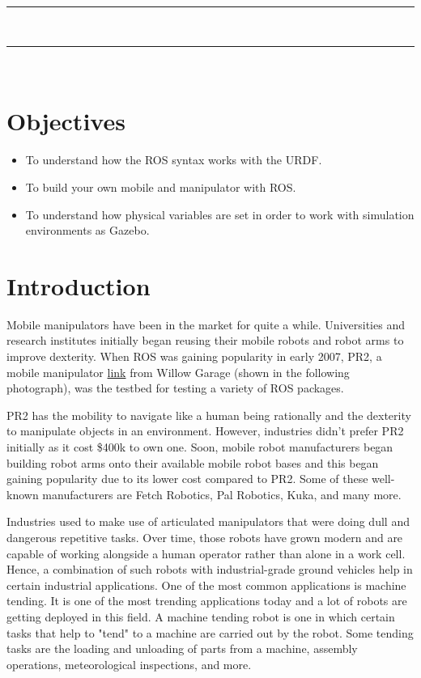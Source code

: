 \documentclass[letterpaper,pdftex]{article}
\begin{document}
\noindent
\textcolor{gray}{\rule{\textwidth}{0.5pt}}\\
\renewcommand{\tablename}{Tabla}
\renewcommand{\arraystretch}{1.2}
\renewcommand\contentsname{Contents}
\tableofcontents

\noindent
\textcolor{gray}{\rule{\textwidth}{0.5pt}}\\

\section{Objectives}
\begin{itemize}
\item To understand how the ROS syntax works with the URDF.
\item To build your own mobile and manipulator with ROS.
\item To understand how physical variables are set in order to work with simulation environments as Gazebo.
\end{itemize}

\section{Introduction}

Mobile manipulators have been in the market for quite a while. Universities and research institutes initially began reusing their mobile robots and robot arms to improve dexterity. When ROS was gaining popularity in early 2007, PR2, a mobile manipulator \href{https://fetchrobotics.com/fetch-mobile-manipulator/}{link} from Willow Garage (shown in the following photograph), was the testbed for testing a variety of ROS packages.

PR2 has the mobility to navigate like a human being rationally and the dexterity to manipulate objects in an environment. However, industries didn't prefer PR2 initially as it cost \$400k to own one. Soon, mobile robot manufacturers began building robot arms onto their available mobile robot bases and this began gaining popularity due to its lower cost compared to PR2. Some of these well-known manufacturers are Fetch Robotics, Pal Robotics, Kuka, and many more.

Industries used to make use of articulated manipulators that were doing dull and dangerous repetitive tasks. Over time, those robots have grown modern and are capable of working alongside a human operator rather than alone in a work cell. Hence, a combination of such robots with industrial-grade ground vehicles help in certain industrial applications. One of the most common applications is machine tending. It is one of the most trending applications today and a lot of robots are getting deployed in this field. A machine tending robot is one in which certain tasks that help to "tend" to a machine are carried out by the robot. Some tending tasks are the loading and unloading of parts from a machine, assembly operations, meteorological inspections, and more.
\end{document}
